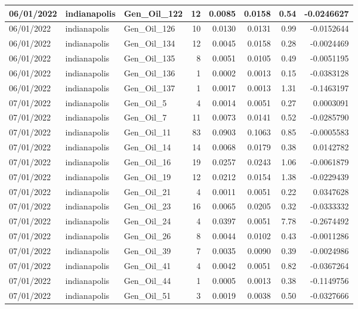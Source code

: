 \documentclass[
  letterpaper,
  DIV=11,
  numbers=noendperiod]{scrartcl}
\begin{document}
\begin{tabular}{l|l|l|r|r|r|r|r}
\hline
06/01/2022 & indianapolis & Gen\_Oil\_122 & 12 & 0.0085 & 0.0158 & 0.54 & -0.0246627\\
\hline
06/01/2022 & indianapolis & Gen\_Oil\_126 & 10 & 0.0130 & 0.0131 & 0.99 & -0.0152644\\
\hline
06/01/2022 & indianapolis & Gen\_Oil\_134 & 12 & 0.0045 & 0.0158 & 0.28 & -0.0024469\\
\hline
06/01/2022 & indianapolis & Gen\_Oil\_135 & 8 & 0.0051 & 0.0105 & 0.49 & -0.0051195\\
\hline
06/01/2022 & indianapolis & Gen\_Oil\_136 & 1 & 0.0002 & 0.0013 & 0.15 & -0.0383128\\
\hline
06/01/2022 & indianapolis & Gen\_Oil\_137 & 1 & 0.0017 & 0.0013 & 1.31 & -0.1463197\\
\hline
07/01/2022 & indianapolis & Gen\_Oil\_5 & 4 & 0.0014 & 0.0051 & 0.27 & 0.0003091\\
\hline
07/01/2022 & indianapolis & Gen\_Oil\_7 & 11 & 0.0073 & 0.0141 & 0.52 & -0.0285790\\
\hline
07/01/2022 & indianapolis & Gen\_Oil\_11 & 83 & 0.0903 & 0.1063 & 0.85 & -0.0005583\\
\hline
07/01/2022 & indianapolis & Gen\_Oil\_14 & 14 & 0.0068 & 0.0179 & 0.38 & 0.0142782\\
\hline
07/01/2022 & indianapolis & Gen\_Oil\_16 & 19 & 0.0257 & 0.0243 & 1.06 & -0.0061879\\
\hline
07/01/2022 & indianapolis & Gen\_Oil\_19 & 12 & 0.0212 & 0.0154 & 1.38 & -0.0229439\\
\hline
07/01/2022 & indianapolis & Gen\_Oil\_21 & 4 & 0.0011 & 0.0051 & 0.22 & 0.0347628\\
\hline
07/01/2022 & indianapolis & Gen\_Oil\_23 & 16 & 0.0065 & 0.0205 & 0.32 & -0.0333332\\
\hline
07/01/2022 & indianapolis & Gen\_Oil\_24 & 4 & 0.0397 & 0.0051 & 7.78 & -0.2674492\\
\hline
07/01/2022 & indianapolis & Gen\_Oil\_26 & 8 & 0.0044 & 0.0102 & 0.43 & -0.0011286\\
\hline
07/01/2022 & indianapolis & Gen\_Oil\_39 & 7 & 0.0035 & 0.0090 & 0.39 & -0.0024986\\
\hline
07/01/2022 & indianapolis & Gen\_Oil\_41 & 4 & 0.0042 & 0.0051 & 0.82 & -0.0367264\\
\hline
07/01/2022 & indianapolis & Gen\_Oil\_44 & 1 & 0.0005 & 0.0013 & 0.38 & -0.1149756\\
\hline
07/01/2022 & indianapolis & Gen\_Oil\_51 & 3 & 0.0019 & 0.0038 & 0.50 & -0.0327666\\

\end{tabular}
\end{document}

